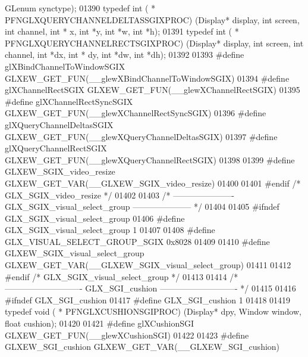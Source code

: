 \begin{DoxyCode}
      GLenum synctype);
01390 \textcolor{keyword}{typedef} int ( * PFNGLXQUERYCHANNELDELTASSGIXPROC) (Display* display, \textcolor{keywordtype}{int} screen, \textcolor{keywordtype}{int} channel, \textcolor{keywordtype}{int} *
      x, \textcolor{keywordtype}{int} *y, \textcolor{keywordtype}{int} *w, \textcolor{keywordtype}{int} *h);
01391 \textcolor{keyword}{typedef} int ( * PFNGLXQUERYCHANNELRECTSGIXPROC) (Display* display, \textcolor{keywordtype}{int} screen, \textcolor{keywordtype}{int} channel, \textcolor{keywordtype}{int} *dx, \textcolor{keywordtype}{int} *
      dy, \textcolor{keywordtype}{int} *dw, \textcolor{keywordtype}{int} *dh);
01392 
01393 \textcolor{preprocessor}{#define glXBindChannelToWindowSGIX GLXEW\_GET\_FUN(\_\_glewXBindChannelToWindowSGIX)}
01394 \textcolor{preprocessor}{#define glXChannelRectSGIX GLXEW\_GET\_FUN(\_\_glewXChannelRectSGIX)}
01395 \textcolor{preprocessor}{#define glXChannelRectSyncSGIX GLXEW\_GET\_FUN(\_\_glewXChannelRectSyncSGIX)}
01396 \textcolor{preprocessor}{#define glXQueryChannelDeltasSGIX GLXEW\_GET\_FUN(\_\_glewXQueryChannelDeltasSGIX)}
01397 \textcolor{preprocessor}{#define glXQueryChannelRectSGIX GLXEW\_GET\_FUN(\_\_glewXQueryChannelRectSGIX)}
01398 
01399 \textcolor{preprocessor}{#define GLXEW\_SGIX\_video\_resize GLXEW\_GET\_VAR(\_\_GLXEW\_SGIX\_video\_resize)}
01400 
01401 \textcolor{preprocessor}{#endif }\textcolor{comment}{/* GLX\_SGIX\_video\_resize */}\textcolor{preprocessor}{}
01402 
01403 \textcolor{comment}{/* ---------------------- GLX\_SGIX\_visual\_select\_group --------------------- */}
01404 
01405 \textcolor{preprocessor}{#ifndef GLX\_SGIX\_visual\_select\_group}
01406 \textcolor{preprocessor}{#define GLX\_SGIX\_visual\_select\_group 1}
01407 
01408 \textcolor{preprocessor}{#define GLX\_VISUAL\_SELECT\_GROUP\_SGIX 0x8028}
01409 
01410 \textcolor{preprocessor}{#define GLXEW\_SGIX\_visual\_select\_group GLXEW\_GET\_VAR(\_\_GLXEW\_SGIX\_visual\_select\_group)}
01411 
01412 \textcolor{preprocessor}{#endif }\textcolor{comment}{/* GLX\_SGIX\_visual\_select\_group */}\textcolor{preprocessor}{}
01413 
01414 \textcolor{comment}{/* ---------------------------- GLX\_SGI\_cushion ---------------------------- */}
01415 
01416 \textcolor{preprocessor}{#ifndef GLX\_SGI\_cushion}
01417 \textcolor{preprocessor}{#define GLX\_SGI\_cushion 1}
01418 
01419 \textcolor{keyword}{typedef} void ( * PFNGLXCUSHIONSGIPROC) (Display* dpy, Window window, \textcolor{keywordtype}{float} cushion);
01420 
01421 \textcolor{preprocessor}{#define glXCushionSGI GLXEW\_GET\_FUN(\_\_glewXCushionSGI)}
01422 
01423 \textcolor{preprocessor}{#define GLXEW\_SGI\_cushion GLXEW\_GET\_VAR(\_\_GLXEW\_SGI\_cushion)}

\end{DoxyCode}
